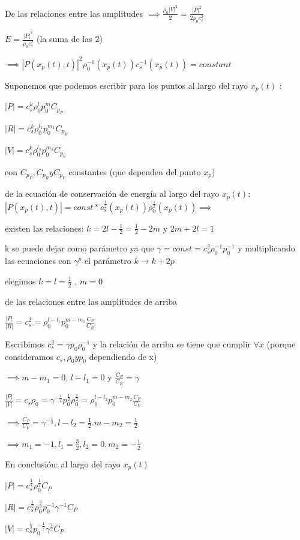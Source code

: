 \documentclass{article}
\begin{document}
\begin{description}  

\item De las relaciones entre las amplitudes $ \implies \frac{\rho_0 |V|^{2}}{2} = \frac{|P|^{2}} {2 \rho_0 c_s^{2}} $
\item $E = \frac{|P|^{2}}{\rho_0 c_s^2} $ (la suma de las 2)
\item $\implies |P(x_p(t),t)|^2 \rho_0^{-1}(x_p(t))c_s^{-1}(x_p(t)) = constant $
\item Suponemos que podemos escribir para los puntos al largo del rayo $x_p(t)$ :
\item $|P| = c_s^{k} \rho_0^{l} p_0^{m} C_{p_P}$
\item $|R| = c_s^{k} \rho_0^{l_1} p_0^{m_1} C_{p_R}$
\item $|V| = c_s^{k} \rho_0^{l_2} p_0^{m_2} C_{p_V}$
\item con $C_{p_P}, C_{p_R} y C_{p_V}$ constantes (que dependen del punto $x_p$)
\item de la ecuación de conservación de energía al largo del rayo $x_p(t)$:
 $|P(x_p(t),t)| = const * c_s^{\frac{1}{2}}(x_p(t)) \rho_0^{\frac{1}{2}}(x_p(t)) \implies$
\item  existen las relaciones: $ k = 2l - \frac{1}{2} = \frac{1}{2} - 2m$ y $2m + 2l = 1$

\item k se puede dejar como parámetro ya que $\gamma = const = c_s^{2} \rho_0^{-1} p_0^{-1} $ y multiplicando las ecuaciones con $\gamma^{p}$ 
el parámetro $k\rightarrow k+2p$ 
\item elegimos $k = l = \frac{1}{2}$ , $m = 0$ 
\item de las relaciones entre las amplitudes de arriba 
\item $\frac{|P|}{|R|} = c_s^2 = \rho_0^{l-l_1} p_0^{m-m_1} \frac{C_{P}}{C_{R}}$
\item Escribimos $c_s^2 = \gamma p_0 \rho_0^{-1}$ y la relación de arriba se tiene que cumplir $\forall x$ (porque consideramos $c_s, \rho_0 y p_0 $ dependiendo de x)
\item $\implies m - m_1 = 0$, $l-l_1 = 0$ y $\frac{C_P}{C_R} = \gamma$
\item $\frac{|P|}{|V|} = c_s \rho_0 = \gamma^{-\frac{1}{2}} p_0^{\frac{1}{2}} \rho_0^{\frac{1}{2}} = \rho_0^{l-l_2} p_0^{m-m_2} \frac{C_P}{C_V}$
\item $\implies  \frac{C_P}{C_V} =  \gamma^{-\frac{1}{2}}, l-l_2=\frac{1}{2}. m-m_2 = \frac{1}{2} $
\item $\implies m_1=-1, l_1 = \frac{3}{2}, l_2 = 0, m_2 = -\frac{1}{2}$
\item En conclusión: al largo del rayo $x_p(t)$ 
\item $|P| = c_s^{\frac{1}{2}} \rho_0^{\frac{1}{2}}  C_{P}$
\item $|R| = c_s^{\frac{1}{2}} \rho_0^{\frac{3}{2}} p_0^{-1} \gamma^{-1} C_{P}$
\item $|V| = c_s^{\frac{1}{2}}  p_0^{-\frac{1}{2}} \gamma^{\frac{1}{2}} C_{P}$


\end{description}
\end{document}
